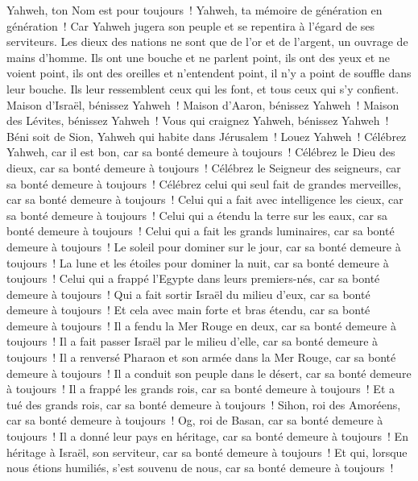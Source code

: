\begin{multicols}{2}
Yahweh, ton Nom est pour toujours~! Yahweh, ta mémoire de génération en génération~!
Car Yahweh jugera son peuple et se repentira à l'égard de ses serviteurs.
Les dieux des nations ne sont que de l'or et de l'argent, un ouvrage de mains d'homme.
Ils ont une bouche et ne parlent point, ils ont des yeux et ne voient point,
ils ont des oreilles et n'entendent point, il n'y a point de souffle dans leur bouche.
Ils leur ressemblent ceux qui les font, et tous ceux qui s'y confient.
Maison d'Israël, bénissez Yahweh~! Maison d'Aaron, bénissez Yahweh~!
Maison des Lévites, bénissez Yahweh~! Vous qui craignez Yahweh, bénissez Yahweh~!
Béni soit de Sion, Yahweh qui habite dans Jérusalem~! Louez Yahweh~!
\VerseOne{}Célébrez Yahweh, car il est bon, car sa bonté demeure à toujours~!
Célébrez le Dieu des dieux, car sa bonté demeure à toujours~!
Célébrez le Seigneur des seigneurs, car sa bonté demeure à toujours~!
Célébrez celui qui seul fait de grandes merveilles, car sa bonté demeure à toujours~!
Celui qui a fait avec intelligence les cieux, car sa bonté demeure à toujours~!
Celui qui a étendu la terre sur les eaux, car sa bonté demeure à toujours~!
Celui qui a fait les grands luminaires, car sa bonté demeure à toujours~!
Le soleil pour dominer sur le jour, car sa bonté demeure à toujours~!
La lune et les étoiles pour dominer la nuit, car sa bonté demeure à toujours~!
Celui qui a frappé l'Egypte dans leurs premiers-nés, car sa bonté demeure à toujours~!
Qui a fait sortir Israël du milieu d'eux, car sa bonté demeure à toujours~!
Et cela avec main forte et bras étendu, car sa bonté demeure à toujours~!
Il a fendu la Mer Rouge en deux, car sa bonté demeure à toujours~!
Il a fait passer Israël par le milieu d'elle, car sa bonté demeure à toujours~!
Il a renversé Pharaon et son armée dans la Mer Rouge, car sa bonté demeure à toujours~!
Il a conduit son peuple dans le désert, car sa bonté demeure à toujours~!
Il a frappé les grands rois, car sa bonté demeure à toujours~!
Et a tué des grands rois, car sa bonté demeure à toujours~!
Sihon, roi des Amoréens, car sa bonté demeure à toujours~!
Og, roi de Basan, car sa bonté demeure à toujours~!
Il a donné leur pays en héritage, car sa bonté demeure à toujours~!
En héritage à Israël, son serviteur, car sa bonté demeure à toujours~!
Et qui, lorsque nous étions humiliés, s'est souvenu de nous, car sa bonté demeure à toujours~!

\end{multicols}
